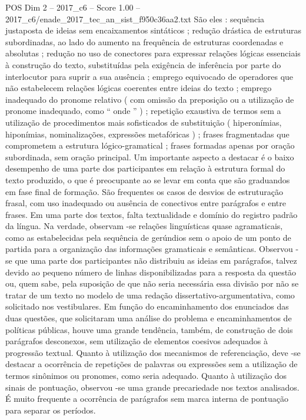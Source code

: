 \begin{textsample}{POS Dim 2 – 2017\_c6 – Score 1.00 – 2017\_c6/enade\_2017\_tec\_an\_sist\_f950c36aa2.txt}
São eles : sequência justaposta de ideias sem encaixamentos sintáticos ; redução drástica de estruturas subordinadas, ao lado do aumento na frequência de estruturas coordenadas e absolutas ; redução no uso de conectores para expressar relações lógicas essenciais à construção do texto, substituídas pela exigência de inferência por parte do interlocutor para suprir a sua ausência ; emprego equivocado de operadores que não estabelecem relações lógicas coerentes entre ideias do texto ; emprego inadequado do pronome relativo ( com omissão da preposição ou a utilização de pronome inadequado, como “ onde ” ) ; repetição exaustiva de termos sem a utilização de procedimentos mais sofisticados de substituição ( hiperonímias, hiponímias, nominalizações, expressões metafóricas ) ; frases fragmentadas que comprometem a estrutura lógico-gramatical ; frases formadas apenas por oração subordinada, sem oração principal.
Um importante aspecto a destacar é o baixo desempenho de uma parte dos participantes em relação à estrutura formal do texto produzido, o que é preocupante ao se levar em conta que são graduandos em fase final de formação.
São frequentes os casos de desvios de estruturação frasal, com uso inadequado ou ausência de conectivos entre parágrafos e entre frases.
Em uma parte dos textos, falta textualidade e domínio do registro padrão da língua.
Na verdade, observam -se relações linguísticas quase agramaticais, como as estabelecidas pela sequência de gerúndios sem o apoio de um ponto de partida para a organização das informações gramaticais e semânticas.
Observou -se que uma parte dos participantes não distribuiu as ideias em parágrafos, talvez devido ao pequeno número de linhas disponibilizadas para a resposta da questão ou, quem sabe, pela suposição de que não seria necessária essa divisão por não se tratar de um texto no modelo de uma redação dissertativo-argumentativa, como solicitado nos vestibulares.
Em função do encaminhamento dos enunciados das duas questões, que solicitaram uma análise do problema e encaminhamentos de políticas públicas, houve uma grande tendência, também, de construção de dois parágrafos desconexos, sem utilização de elementos coesivos adequados à progressão textual.
Quanto à utilização dos mecanismos de referenciação, deve -se destacar a ocorrência de repetições de palavras ou expressões sem a utilização de termos sinônimos ou pronomes, como seria adequado.
Quanto à utilização dos sinais de pontuação, observou -se uma grande precariedade nos textos analisados.
É muito frequente a ocorrência de parágrafos sem marca interna de pontuação para separar os períodos.

\end{textsample}
